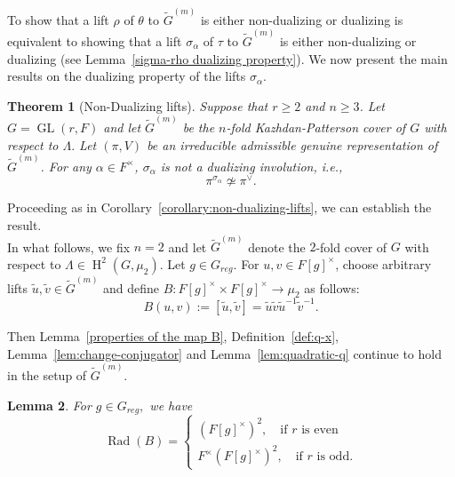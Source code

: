 \documentclass[11pt, a4paper, reqno]{amsart}
\newtheorem{theorem}{Theorem}[section]
\newtheorem{lemma}[theorem]{Lemma}
\theoremstyle{definition}
\theoremstyle{remark}
\theoremstyle{example}
\theoremstyle{note}
\numberwithin{equation}{section}
\DeclareMathOperator{\GL}{GL}
\DeclareMathOperator{\coh}{H}
\DeclareMathOperator{\Rad}{Rad}
\begin{document}
To show that a lift $\rho$ of $\theta$ to $\widetilde{G}^{(m)}$ is either  non-dualizing or dualizing is equivalent to showing that a lift $\sigma_\alpha$ of $\tau$ to $\widetilde{G}^{(m)}$ is either non-dualizing or dualizing (see Lemma~\ref{sigma-rho dualizing property}). We now present the main results on the dualizing property of the lifts $\sigma_\alpha$.






\begin{theorem}[Non-Dualizing lifts] Suppose that $r\geq 2$ and $n\geq3$. Let $G=\GL(r,F)$ and let $\widetilde{G}^{(m)}$ be the $n$-fold Kazhdan-Patterson cover of $G$ with respect to $\Lambda.$ Let $(\pi, V)$ be an irreducible admissible genuine representation of $\widetilde{G}^{(m)}$.  For any $\alpha \in F^{\times}$, $\sigma_\alpha$ is not a dualizing involution, i.e.,
\[\pi^{\sigma_{\alpha}}\not\simeq \pi^{\vee}. \] 
\end{theorem}
     


Proceeding as in Corollary~\ref{corollary:non-dualizing-lifts}, we can establish the result. \\


In what follows, we fix $n=2$ and let  $\widetilde{G}^{(m)}$ denote the $2$-fold cover of $G$ with respect to $\Lambda \in \coh^{2}(G, \mu_{2})$. Let $g \in G_{reg}.$ For $u,v\in F[g]^\times$, choose arbitrary lifts $\tilde{u},\tilde{v}\in\widetilde{G}^{(m)}$ and define $B: F[g]^\times \times F[g]^\times \longrightarrow \mu_2$ as follows: 
$$B(u,v):=[\tilde{u},\tilde{v}]
=\tilde{u}\tilde{v}\tilde{u}^{-1}\tilde{v}^{-1}.$$

Then Lemma~\ref{properties of the map B}, Definition~\ref{def:q-x}, Lemma~\ref{lem:change-conjugator} and Lemma~\ref{lem:quadratic-q} continue to hold in the setup of $\widetilde{G}^{(m)}$.

\begin{lemma}\label{Rad for twisted covers}
For $g \in G_{reg},$ we have
$$\Rad(B) = \begin{cases}
     (F[g]^\times)^2, \quad \mbox{if $r$ is even} \\ 
     F^\times (F[g]^\times)^2, \quad \mbox{if $r$ is odd} .
 \end{cases}$$

\end{lemma}
\end{document}
